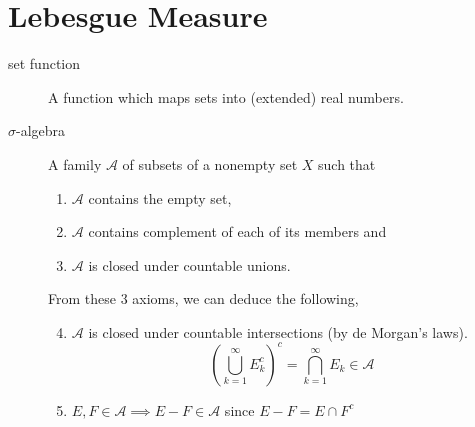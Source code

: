 

\section{Lebesgue Measure}
\begin{description}
	\item[set function] A function which maps sets into (extended) real numbers.
	\item[$\sigma$-algebra] A family $\mathcal{A}$ of subsets of a nonempty set $X$ such that
	\begin{enumerate}
		\item $\mathcal{A}$ contains the empty set, 
		\item $\mathcal{A}$ contains complement of each of its members and
		\item $\mathcal{A}$ is closed under countable unions.
	\end{enumerate}
	
	From these 3 axioms, we can deduce the following,
	\begin{enumerate}
		\setcounter{enumi}{3}
		\item $\mathcal{A}$ is closed under countable intersections (by de Morgan's laws).
			$$\left( \bigcup_{k = 1}^\infty E_k^c \right)^c = \bigcap_{k=1}^\infty E_k \in \mathcal{A}$$
		\item $E,F \in \mathcal{A} \implies E-F \in \mathcal{A}$ since $E-F = E \cap F^c$
	\end{enumerate}
\end{description}


